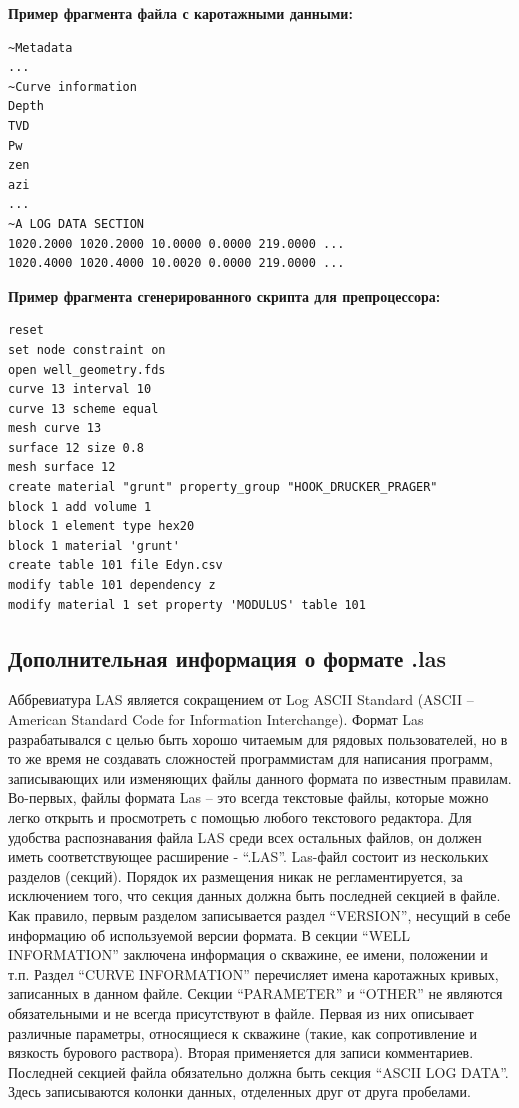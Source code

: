 \documentclass[a4paper,14pt]{scrartcl}
\begin{document}
\vspace{10mm}
\textbf{Пример фрагмента файла с каротажными данными:} 
\begin{lstlisting}[frame=single]
~Metadata
...
~Curve information
Depth
TVD
Pw
zen
azi
...
~A LOG DATA SECTION
1020.2000 1020.2000 10.0000 0.0000 219.0000 ...
1020.4000 1020.4000 10.0020 0.0000 219.0000 ...
\end{lstlisting}

\newpage
\textbf{Пример фрагмента сгенерированного скрипта для препроцессора:} 
\begin{lstlisting}[frame=single]
reset
set node constraint on
open well_geometry.fds
curve 13 interval 10
curve 13 scheme equal
mesh curve 13
surface 12 size 0.8
mesh surface 12
create material "grunt" property_group "HOOK_DRUCKER_PRAGER" 
block 1 add volume 1
block 1 element type hex20
block 1 material 'grunt'
create table 101 file Edyn.csv
modify table 101 dependency z
modify material 1 set property 'MODULUS' table 101
\end{lstlisting}

\subsection{Дополнительная информация о формате .las}
Аббревиатура LAS является сокращением от Log ASCII Standard (ASCII – American Standard Code for Information Interchange).
Формат Las разрабатывался с целью быть хорошо читаемым для рядовых пользователей, но в то же время не создавать сложностей программистам для написания программ, записывающих или изменяющих файлы данного формата по известным правилам. Во-первых, файлы формата Las – это всегда текстовые файлы, которые можно легко открыть и просмотреть с помощью любого текстового редактора.  Для удобства распознавания файла LAS среди всех остальных файлов, он должен иметь соответствующее расширение - “.LAS”. Las-файл состоит из нескольких разделов (секций). Порядок их размещения никак не регламентируется, за исключением того, что секция данных должна быть последней секцией в файле. Как правило, первым разделом записывается раздел “VERSION”, несущий в себе информацию об используемой версии формата. В секции “WELL INFORMATION” заключена информация о скважине, ее имени, положении и т.п. Раздел “CURVE INFORMATION” перечисляет имена каротажных кривых, записанных в данном файле. Секции “PARAMETER” и “OTHER” не являются обязательными и не всегда присутствуют в файле. Первая из них описывает различные параметры, относящиеся к скважине (такие, как сопротивление и вязкость бурового раствора). Вторая применяется для записи комментариев. Последней секцией файла обязательно должна быть секция “ASCII LOG DATA”. Здесь записываются колонки данных, отделенных друг от друга пробелами.
\end{document}
